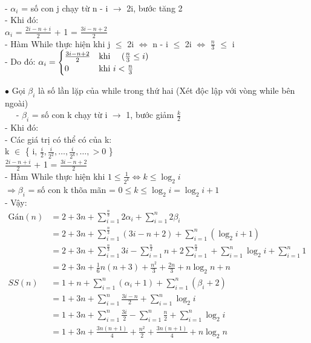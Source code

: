 \documentclass[12pt, letterpaper]{article}
\begin{document}
	$\quad${ 
	- $\alpha_i$ = số con j chạy từ n - i $\rightarrow$ 2i, bước tăng 2 \\
	- Khi đó:\\
	$\alpha_i$ = $\frac{2i - n + i}{2}$ + 1 = $\frac{3i - n + 2}{2}$\\
	- Hàm While thực hiện khi j $\leq$ 2i $\Leftrightarrow$ n - i $\leq$ 2i $\Leftrightarrow$ $\frac{n}{3}$ $\leq$ i\\  
	- Do đó: $\alpha_i =
	\begin{cases}
	\frac{3i - n + 2}{2} &\text{khi } \quad (\frac{n}{3} \leq i)\\
	0 &\text{khi } i < \frac{n}{3}
	\end{cases} \\$

	$\bullet$ Gọi $\beta_i$ là số lần lặp của while trong thứ hai (Xét độc lập với vòng while bên ngoài)\\
	$\quad${ 
	- $\beta_i$ = số con k chạy từ i $\rightarrow$ 1, bước giảm $\frac{k}{2}$  \\
	- Khi đó:\\
	- Các giá trị có thể có của k: \\
     k $\in$ \{ i, $\frac{i}{2}, \frac{i}{2^2}, \ldots, \frac{i}{2^k}, \ldots, >0$ \} \\  $\frac{2i - n + i}{2}$ + 1 = $\frac{3i - n + 2}{2}$\\
	- Hàm While thực hiện khi $1 \leq \frac{1}{2^k}  \Leftrightarrow k \leq \log_2 i$\\  
	$\Rightarrow \beta_i$ = số \space con k thõa mãn = $0 \leq k \leq \log_2 i = \log_2 i+1$\\
	- Vậy: \\
	$ \begin{aligned}
		\text{Gán}(n) & = 2 + 3n + \sum^{\frac{n}{3} }_{i = 1} 2 \alpha_i  + \sum^{n}_{i = 1} 2 \beta_i\\
		& = 2 + 3n + \sum^{\frac{n}{3} }_{i = 1} (3i -n + 2) + \sum^{n}_{i = 1}(\log_2 i+1)\\
			& = 2 + 3n + \sum^{\frac{n}{3} }_{i = 1} 3i - \sum^{\frac{n}{3} }_{i = 1}n + 2\sum^{\frac{n}{3} }_{i = 1}  + \sum^{n}_{i = 1}\log_2 i+\sum^{n}_{i = 1}1\\
			& = 2 + 3n + \frac{1}{6}n(n+3) + \frac{n^2}{3} +\frac{2n}{3} + n\log_2n + n\
			\\SS(n) & = 1 + n + \sum^{n}_{i = 1} (\alpha_i  + 1) + \sum^{n}_{i = 1} ( \beta_i + 2)\\
			& = 1 + 3n + \sum^{n}_{i = 1} \frac{3i - n}{2} + \sum^{n}_{i = 1}\log_2 i\\
			& = 1 + 3n + \sum^{n}_{i = 1} \frac{3i}{2} - \sum^{n}_{i = 1} \frac{n}{2}+\sum^{n}_{i = 1}\log_2 i\\
			& = 1 + 3n + \frac{3n(n+1)}{4}+ \frac{n^2}{2}+ \frac{3n(n+1)}{4} + n\log_2n\\
	\end{aligned} $ \\

}}
\end{document}
